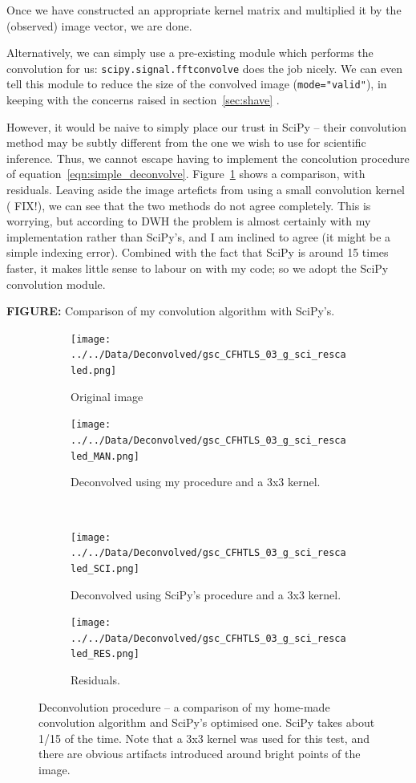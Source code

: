 \documentclass[letterpaper, 11pt]{article}
\def\MORE{{\color{red}{\bf MORE}}\xspace}
\def\FIG#1{{\bf FIGURE: }{#1}}
\begin{document}
Once we have constructed an appropriate kernel matrix and multiplied it by the (observed) image vector, we are done.

Alternatively, we can simply use a pre-existing module which performs the convolution for us: \texttt{scipy.signal.fftconvolve} does the job nicely. We can even tell this module to reduce the size of the convolved image (\texttt{mode="valid"}), in keeping with the concerns raised in section~\ref{sec:shave} .

However, it would be naive to simply place our trust in SciPy -- their convolution method may be subtly different from the one we wish to use for scientific inference. Thus, we cannot escape having to implement the concolution procedure of equation~\ref{eqn:simple_deconvolve}. Figure~\ref{fig:deconvolution_comparison} shows a comparison, with residuals. Leaving aside the image arteficts from using a small convolution kernel (\MORE FIX!), we can see that the two methods do not agree completely. This is worrying, but according to DWH the problem is almost certainly with my implementation rather than SciPy's, and I am inclined to agree (it might be a simple indexing error). Combined with the fact that SciPy is around 15 times faster, it makes little sense to labour on with my code; so we adopt the SciPy convolution module.

\FIG{Comparison of my convolution algorithm with SciPy's.}

\begin{figure}
	\def\width{0.3\textwidth}
	\centering
	\begin{subfigure}{\width}
		\texttt{[image: ../../Data/Deconvolved/gsc\_CFHTLS\_03\_g\_sci\_rescaled.png]}
		\caption{Original image}
	\end{subfigure}
	
	\begin{subfigure}{\width}
		\texttt{[image: ../../Data/Deconvolved/gsc\_CFHTLS\_03\_g\_sci\_rescaled\_MAN.png]}
		\caption{Deconvolved using my procedure and a 3x3 kernel.}
	\end{subfigure}
	~
	\begin{subfigure}{\width}
		\texttt{[image: ../../Data/Deconvolved/gsc\_CFHTLS\_03\_g\_sci\_rescaled\_SCI.png]}
		\caption{Deconvolved using SciPy's procedure and a 3x3 kernel.}
	\end{subfigure}
	
	\begin{subfigure}{\width}
		\texttt{[image: ../../Data/Deconvolved/gsc\_CFHTLS\_03\_g\_sci\_rescaled\_RES.png]}
		\caption{Residuals.}
	\end{subfigure}
	\caption{Deconvolution procedure -- a comparison of my home-made convolution algorithm and SciPy's optimised one. SciPy takes about 1/15 of the time. Note that a 3x3 kernel was used for this test, and there are obvious artifacts introduced around bright points of the image.}
	\label{fig:deconvolution_comparison}
\end{figure}
\end{document}
